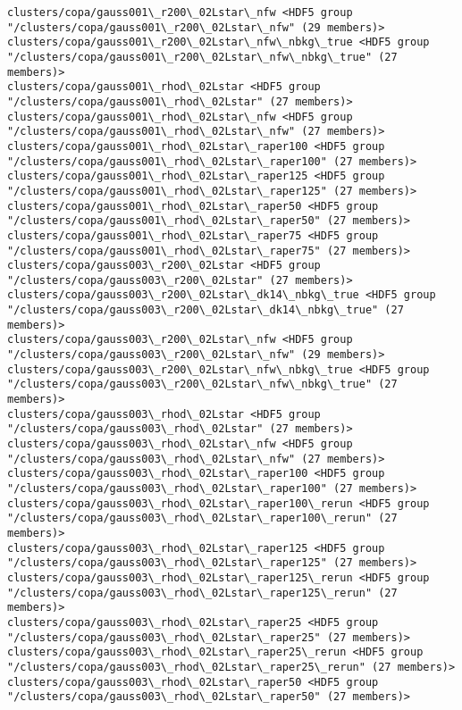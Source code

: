 \documentclass[11pt]{article}
\begin{document}
\begin{Verbatim}[commandchars=\\\{\}]
clusters/copa/gauss001\_r200\_02Lstar\_nfw <HDF5 group "/clusters/copa/gauss001\_r200\_02Lstar\_nfw" (29 members)>
clusters/copa/gauss001\_r200\_02Lstar\_nfw\_nbkg\_true <HDF5 group "/clusters/copa/gauss001\_r200\_02Lstar\_nfw\_nbkg\_true" (27 members)>
clusters/copa/gauss001\_rhod\_02Lstar <HDF5 group "/clusters/copa/gauss001\_rhod\_02Lstar" (27 members)>
clusters/copa/gauss001\_rhod\_02Lstar\_nfw <HDF5 group "/clusters/copa/gauss001\_rhod\_02Lstar\_nfw" (27 members)>
clusters/copa/gauss001\_rhod\_02Lstar\_raper100 <HDF5 group "/clusters/copa/gauss001\_rhod\_02Lstar\_raper100" (27 members)>
clusters/copa/gauss001\_rhod\_02Lstar\_raper125 <HDF5 group "/clusters/copa/gauss001\_rhod\_02Lstar\_raper125" (27 members)>
clusters/copa/gauss001\_rhod\_02Lstar\_raper50 <HDF5 group "/clusters/copa/gauss001\_rhod\_02Lstar\_raper50" (27 members)>
clusters/copa/gauss001\_rhod\_02Lstar\_raper75 <HDF5 group "/clusters/copa/gauss001\_rhod\_02Lstar\_raper75" (27 members)>
clusters/copa/gauss003\_r200\_02Lstar <HDF5 group "/clusters/copa/gauss003\_r200\_02Lstar" (27 members)>
clusters/copa/gauss003\_r200\_02Lstar\_dk14\_nbkg\_true <HDF5 group "/clusters/copa/gauss003\_r200\_02Lstar\_dk14\_nbkg\_true" (27 members)>
clusters/copa/gauss003\_r200\_02Lstar\_nfw <HDF5 group "/clusters/copa/gauss003\_r200\_02Lstar\_nfw" (29 members)>
clusters/copa/gauss003\_r200\_02Lstar\_nfw\_nbkg\_true <HDF5 group "/clusters/copa/gauss003\_r200\_02Lstar\_nfw\_nbkg\_true" (27 members)>
clusters/copa/gauss003\_rhod\_02Lstar <HDF5 group "/clusters/copa/gauss003\_rhod\_02Lstar" (27 members)>
clusters/copa/gauss003\_rhod\_02Lstar\_nfw <HDF5 group "/clusters/copa/gauss003\_rhod\_02Lstar\_nfw" (27 members)>
clusters/copa/gauss003\_rhod\_02Lstar\_raper100 <HDF5 group "/clusters/copa/gauss003\_rhod\_02Lstar\_raper100" (27 members)>
clusters/copa/gauss003\_rhod\_02Lstar\_raper100\_rerun <HDF5 group "/clusters/copa/gauss003\_rhod\_02Lstar\_raper100\_rerun" (27 members)>
clusters/copa/gauss003\_rhod\_02Lstar\_raper125 <HDF5 group "/clusters/copa/gauss003\_rhod\_02Lstar\_raper125" (27 members)>
clusters/copa/gauss003\_rhod\_02Lstar\_raper125\_rerun <HDF5 group "/clusters/copa/gauss003\_rhod\_02Lstar\_raper125\_rerun" (27 members)>
clusters/copa/gauss003\_rhod\_02Lstar\_raper25 <HDF5 group "/clusters/copa/gauss003\_rhod\_02Lstar\_raper25" (27 members)>
clusters/copa/gauss003\_rhod\_02Lstar\_raper25\_rerun <HDF5 group "/clusters/copa/gauss003\_rhod\_02Lstar\_raper25\_rerun" (27 members)>
clusters/copa/gauss003\_rhod\_02Lstar\_raper50 <HDF5 group "/clusters/copa/gauss003\_rhod\_02Lstar\_raper50" (27 members)>

\end{Verbatim}
\end{document}
